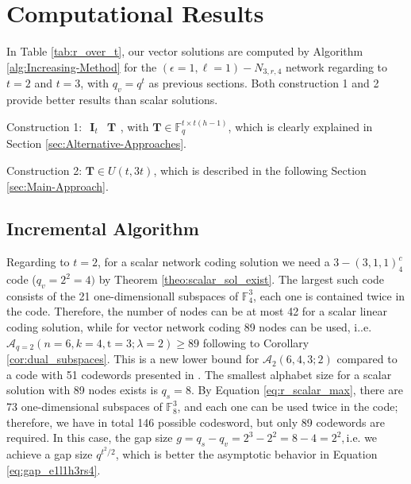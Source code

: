 \chapter{Computational Results} \label{chap:comp_method}

In Table \ref{tab:r_over_t}, our vector solutions are computed by
Algorithm \ref{alg:Increasing-Method} for the $\left(\epsilon=1,\ell=1\right)-\ensuremath{N}_{3,r,4}$
network regarding to $t=2$ and $t=3$, with $q_{v}=q^{t}$ as previous
sections. Both construction 1 and 2 provide better results than scalar
solutions. 

Construction 1: $\begin{array}{c|c}
\boldsymbol{I}_{t} & \boldsymbol{T}\end{array}$, with $\boldsymbol{T}\in\ensuremath{\mathbb{F}}_{q}^{t\times t\left(h-1\right)}$,
which is clearly explained in Section \ref{sec:Alternative-Approaches}.

Construction 2: $\boldsymbol{T}\in U\left(t,3t\right)$, which is
described in the following Section \ref{sec:Main-Approach}.

\section{Incremental Algorithm \label{sec:Main-Approach}}

Regarding to $t=2$, for a scalar network coding solution we need
a $3-\left(3,1,1\right)_{4}^{c}$ code ($q_{v}=2^{2}=4)$ by Theorem
\ref{theo:scalar_sol_exist}. The largest such code consists of the
21 one-dimensionall subspaces of $\ensuremath{\mathbb{F}}_{4}^{3}$,
each one is contained twice in the code. Therefore, the number of
nodes can be at most 42 for a scalar linear coding solution, while
for vector network coding 89 nodes can be used, i..e. $\mathcal{A}_{q=2}\left(n=6,k=4,\mathrm{t}=3;\lambda=2\right)\geq89$
following to Corollary \ref{cor:dual_subspaces}. This is a new lower
bound for $\mathcal{A}_{2}\left(6,4,3;2\right)$ compared to a code
with 51 codewords presented in \cite{Wachter-Zeh:2018}. The smallest
alphabet size for a scalar solution with 89 nodes exists is $q_{s}=8$.
By Equation \ref{eq:r_scalar_max}, there are 73 one-dimensional subspaces
of $\ensuremath{\mathbb{F}}_{8}^{3}$, and each one can be used twice
in the code; therefore, we have in total 146 possible codesword, but
only 89 codewords are required. In this case, the gap size $g=q_{s}-q_{v}=2^{3}-2^{2}=8-4=2^{2},$i.e.
we achieve a gap size $q^{t^{2}/2}$, which is better the asymptotic
behavior in Equation \ref{eq:gap_e1l1h3rs4}. 

